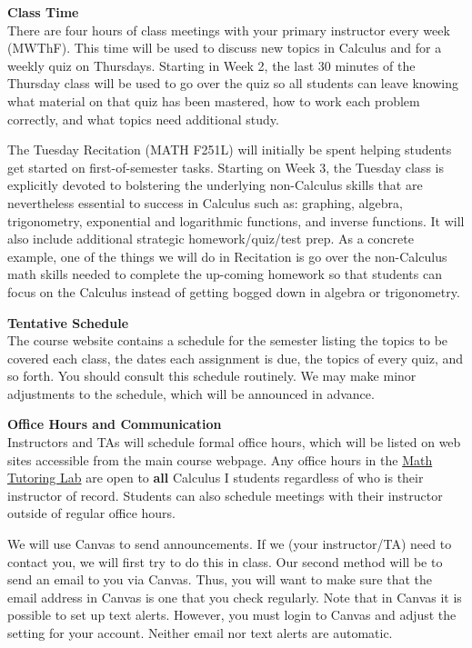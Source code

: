 \documentclass[12pt]{article}
\renewcommand{\emph}[1]{\textsf{\textbf{#1}}}
\newcommand{\localhead}[1]{\par\smallskip\textbf{#1}\nobreak\\}%
\def\heading#1{\localhead{\large\emph{#1}}}
\begin{document}
\newpage

\heading{Class Time}
There are four hours of class meetings with your primary instructor every week (MWThF). This time will be used to discuss new topics in Calculus and for a weekly quiz on Thursdays. Starting in Week 2, the last 30 minutes of the Thursday class will be used to go over the quiz so all students can leave knowing what material on that quiz has been mastered, how to work each problem correctly,  and what topics need additional study. 

The Tuesday Recitation (MATH F251L) will initially be spent helping students get started on first-of-semester tasks. Starting on Week 3, the Tuesday class is explicitly devoted to bolstering the underlying non-Calculus skills that are nevertheless essential to success in Calculus such as: graphing, algebra, trigonometry, exponential and logarithmic functions, and inverse functions. It will also include additional strategic homework/quiz/test prep. As a concrete example, one of the things we will do in Recitation is go over the non-Calculus math skills needed to complete the up-coming homework so that students can focus on the Calculus instead of getting bogged down in algebra or trigonometry.

\heading{Tentative Schedule}
The course website contains a %
schedule for the semester listing
the topics to be covered each class, the dates each assignment is due,
the topics of every quiz, and so forth. You should consult this schedule
routinely.  We may make minor adjustments to the schedule, which
will be announced in advance.

\heading{Office Hours and Communication}
Instructors and TAs will schedule formal office hours,
which will be listed on web sites accessible from the main
course webpage. Any office hours in the \href{https://uaf.edu/dms/mathlab/}{Math Tutoring Lab} are open to \emph{all} Calculus I students regardless of who is their instructor of record. Students can also schedule meetings with their instructor outside of regular office hours. 

We will use Canvas to send announcements. If we (your instructor/TA) need to contact you, we will first try to do this in class. Our second method will be to send an email to you via Canvas. Thus, you will want to make sure that the email address in Canvas is one that you check regularly. Note that in Canvas it is possible to set up text alerts. However, you must login to Canvas and adjust the setting for your account. Neither email nor text alerts are automatic.
\end{document}
